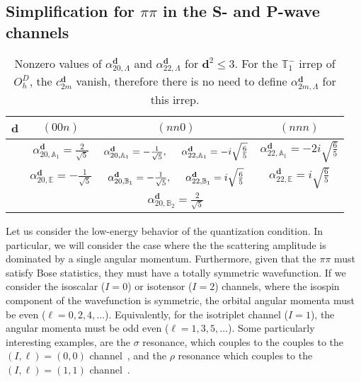   


\subsection{Simplification for $\pi\pi$ in the S- and P-wave channels}
\begin{center}
\begin{table} 
\begin{tabular}{ c c c c} 
\hspace{.1cm}\textbf{d}\hspace{.1cm}& 
 \hspace{.1cm}$(00n)$\hspace{.1cm}& 
 \hspace{.1cm}$(nn0)$\hspace{.1cm}& 
 \hspace{.1cm}$(nnn)$\hspace{.1cm}
 \\\hline
& $\alpha_{20,\mathbb{A}_1}^\mathbf{d} =\frac{2}{\sqrt{5}}$
& $\alpha_{20,\mathbb{A}_1}^\mathbf{d} =-\frac{1}{\sqrt{5}},\hspace{.5cm}
\alpha_{22,\mathbb{A}_1}^\mathbf{d} =-i\sqrt{\frac{6}{5}}$
& $\alpha_{22,\mathbb{A}_1}^\mathbf{d} =-2i\sqrt{\frac{6}{5}}$
 \\ 
 & $\alpha_{20,\mathbb{E}}^\mathbf{d} =-\frac{1}{\sqrt{5}}$
  & 
 $\alpha_{20,\mathbb{B}_1}^\mathbf{d} =-\frac{1}{\sqrt{5}},\hspace{.5cm}
  \alpha_{22,\mathbb{B}_1}^\mathbf{d} =i\sqrt{\frac{6}{5}}$
 & $\alpha_{22,\mathbb{E}}^\mathbf{d} =i\sqrt{\frac{6}{5}}$\\
 && 
 $\alpha_{20,\mathbb{B}_2}^\mathbf{d} =\frac{2}{\sqrt{5}}$
\vspace{.05cm}\\ \hline
\end{tabular}
\caption{Nonzero values of $\alpha_{20,\Lambda}^\mathbf{d}$ and $\alpha_{22,\Lambda}^\mathbf{d}$ for ${\mathbf{d}^2}\leq3$. For the $\mathbb{T}_1^-$ irrep of ${O}^D_h$, the $c^\mathbf{d}_{2m}$ vanish, therefore there is no need to define $\alpha_{2m,\Lambda}^\mathbf{d}$ for this irrep. 
}
\label{table:alphad}
\end{table}
\end{center} 

Let us consider the low-energy behavior of the quantization condition. In particular, we will consider the case where the  the scattering amplitude is dominated by a single angular momentum. Furthermore, given that the $\pi\pi$ must satisfy Bose statistics, they must have a totally symmetric wavefunction. If we consider the isoscalar ($I=0$) or isotensor ($I=2$) channels, where the isospin component of the wavefunction is symmetric, the orbital angular momenta must be even ($\ell=0,2,4,\ldots$). Equivalently, for the isotriplet channel ($I=1$), the angular momenta must be odd even ($\ell=1,3,5,\ldots$). Some particularly interesting examples, are the $\sigma$ resonance, which couples to the couples to the $(I,\ell)=(0,0)$ channel~\cite{Briceno:2016mjc}, and the $\rho$ resonance which couples to the $(I,\ell)=(1,1)$ channel~\cite{Wilson:2015dqa, Dudek:2012xn}. 

